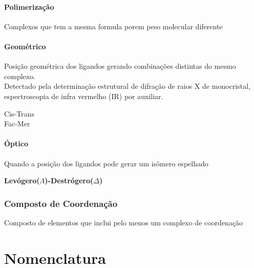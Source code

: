 \documentclass{article}
\begin{document}
\begin{multicols}{2}
\vspace{10mm}

\subsection{Polimerização}
\label{isomerismo de polimerizacao}
%
Complexos que tem a mesma formula porem peso molecular diferente
%

\begin{center}\ch{%
	[PtCl2(NH3)2] <-> [Pt(NH3)4][PtCl4] %
} \end{center}

\subsection{Geométrico}
\label{isomerismo geometrico}
%
Posição geométrica dos ligandos gerando combinações distintas do mesmo complexo.\\
Detectado pela determinação estrutural de difração de raios X de monocristal, espectroscopia de infra vermelho (IR) por auxiliar.
%
\begin{center}\bfseries

	Cis-Trans
\\	Fac-Mer	
\end{center}

\subsection{Óptico}
\label{isomerismo optico}
%
Quando a posição dos ligandos pode gerar um isômero espelhado
%
\begin{center}\bfseries
	Levógero($\Lambda$)-Destrógero($\Delta$)
\end{center}

\vfill

\end{multicols}

\section{Composto de Coordenação}
\label{composto de coordenacao}
%
Composto de elementos que inclui pelo menos um complexo de coordenação
%









\newpage



\part{Nomenclatura}
\label{nomenclatura}
\end{document}
